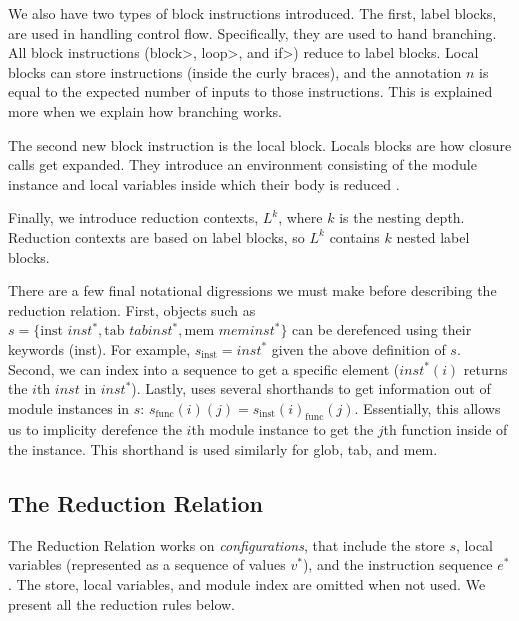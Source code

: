 We also have two types of block instructions introduced.
The first, label blocks, are used in handling control flow.
Specifically, they are used to hand branching.
All block instructions (\<block>, \<loop>, and \<if>) reduce to label blocks.
Local blocks can store instructions (inside the curly braces), and the annotation $n$ is equal to the expected number of inputs to those instructions.
This is explained more when we explain how branching works.

The second new block instruction is the local block.
Locals blocks are how closure calls get expanded.
They introduce an environment consisting of the module instance and local variables inside which their body is reduced .

Finally, we introduce reduction contexts, $L^{k}$, where $k$ is the nesting depth.
Reduction contexts are based on label blocks, so $L^{k}$ contains $k$ nested label blocks.

There are a few final notational digressions we must make before describing the reduction relation.
First, objects such as $s=\{\text{inst } inst^{*}, \text{tab } tabinst^{*}, \text{mem } meminst^{*}\}$ can be derefenced using their keywords (\eg inst).
For example, $s_\text{inst}=inst^{*}$ given the above definition of $s$.
Second, we can index into a sequence to get a specific element (\eg $inst^{*}(i)$ returns the $i$th $inst$ in $inst^{*}$).
Lastly, \wasm uses several shorthands to get information out of module instances in $s$: $s_\text{func}(i)(j)=s_\text{inst}(i)_\text{func}(j)$.
Essentially, this allows us to implicity derefence the $i$th module instance to get the $j$th function inside of the instance.
This shorthand is used similarly for glob, tab, and mem.

\subsection{The \wasm Reduction Relation}
The \wasm Reduction Relation works on \emph{configurations}, that include the store $s$, local variables (represented as a sequence of values $v^{*}$), and the instruction sequence $e^{*}$.
The store, local variables, and module index are omitted when not used.
We present all the reduction rules below.

\begin{mathpar}
\end{mathpar}

